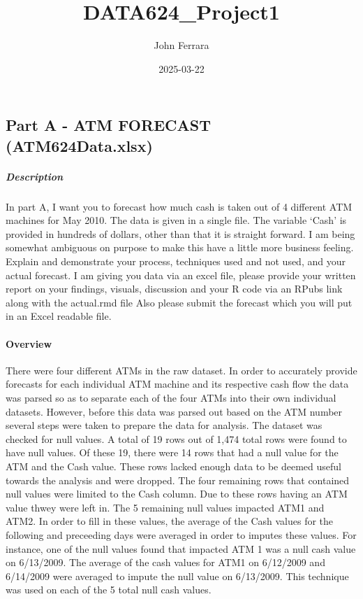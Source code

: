 \documentclass[
]{article}
\title{DATA624\_Project1}
\author{John Ferrara}
\date{2025-03-22}
\begin{document}
\maketitle

\subsection{Part A - ATM FORECAST
(ATM624Data.xlsx)}\label{part-a---atm-forecast-atm624data.xlsx}

\subparagraph{Description}\label{description}

In part A, I want you to forecast how much cash is taken out of 4
different ATM machines for May 2010. The data is given in a single file.
The variable `Cash' is provided in hundreds of dollars, other than that
it is straight forward. I am being somewhat ambiguous on purpose to make
this have a little more business feeling. Explain and demonstrate your
process, techniques used and not used, and your actual forecast. I am
giving you data via an excel file, please provide your written report on
your findings, visuals, discussion and your R code via an RPubs link
along with the actual.rmd file Also please submit the forecast which you
will put in an Excel readable file.

\paragraph{Overview}\label{overview}

There were four different ATMs in the raw dataset. In order to
accurately provide forecasts for each individual ATM machine and its
respective cash flow the data was parsed so as to separate each of the
four ATMs into their own individual datasets. However, before this data
was parsed out based on the ATM number several steps were taken to
prepare the data for analysis. The dataset was checked for null values.
A total of 19 rows out of 1,474 total rows were found to have null
values. Of these 19, there were 14 rows that had a null value for the
ATM and the Cash value. These rows lacked enough data to be deemed
useful towards the analysis and were dropped. The four remaining rows
that contained null values were limited to the Cash column. Due to these
rows having an ATM value thwey were left in. The 5 remaining null values
impacted ATM1 and ATM2. In order to fill in these values, the average of
the Cash values for the following and preceeding days were averaged in
order to imputes these values. For instance, one of the null values
found that impacted ATM 1 was a null cash value on 6/13/2009. The
average of the cash values for ATM1 on 6/12/2009 and 6/14/2009 were
averaged to impute the null value on 6/13/2009. This technique was used
on each of the 5 total null cash values.
\end{document}
